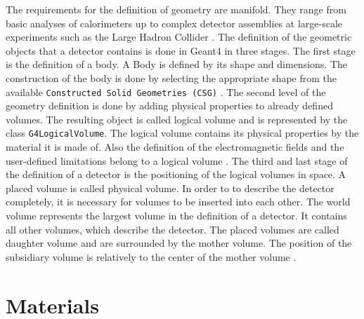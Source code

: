 \documentclass[12pt, a4paper]{thesis}
\begin{document}
The requirements for the definition of geometry are manifold. They range from
basic analyses of calorimeters up to complex detector assemblies at large-scale
experiments such as the Large Hadron Collider \cite{geant4_geom}. The definition
of the geometric objects that a detector contains is done in Geant4 in three
stages.  The first stage is the definition of a body. A Body is defined by its
shape and dimensions. The construction of the body is done by selecting the
appropriate shape from the available \texttt{Constructed Solid Geometries (CSG)}
\cite{geant4_geom}. The second level of the geometry definition is done by adding
physical properties to already defined volumes. The resulting object is called
logical volume and is represented by the class \texttt{G4LogicalVolume}. The logical
volume contains its physical properties by the material it is made of. Also the
definition of the electromagnetic fields and the user-defined limitations belong
to a logical volume \cite{geant4-doc}. The third and last stage of the definition
of a detector is the positioning of the logical volumes in space. A placed
volume is called physical volume. In order to to describe the detector
completely, it is necessary for volumes to be inserted into each other.  The
world volume represents the largest volume in the definition of a detector. It
contains all other volumes, which describe the detector. The placed volumes are
called daughter volume and are surrounded by the mother volume.  The position of
the subsidiary volume is relatively to the center of the mother volume
\cite{geant4-doc}.

\section{Materials}
\label{sec:org11f3d27}
\end{document}
